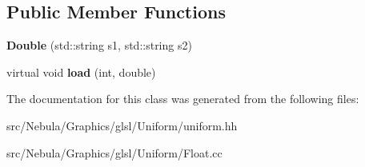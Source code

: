 \subsection*{\-Public \-Member \-Functions}
\begin{DoxyCompactItemize}
\item 
\hypertarget{classNeb_1_1glsl_1_1Uniform_1_1Vector_1_1Double_a4f5b3ffeff4c2d183a7af7401c434731}{{\bfseries \-Double} (std\-::string s1, std\-::string s2)}\label{classNeb_1_1glsl_1_1Uniform_1_1Vector_1_1Double_a4f5b3ffeff4c2d183a7af7401c434731}

\item 
\hypertarget{classNeb_1_1glsl_1_1Uniform_1_1Vector_1_1Double_a7241e6a2f7b3041cbc2beca1f83d504a}{virtual void {\bfseries load} (int, double)}\label{classNeb_1_1glsl_1_1Uniform_1_1Vector_1_1Double_a7241e6a2f7b3041cbc2beca1f83d504a}

\end{DoxyCompactItemize}


\-The documentation for this class was generated from the following files\-:\begin{DoxyCompactItemize}
\item 
src/\-Nebula/\-Graphics/glsl/\-Uniform/uniform.\-hh\item 
src/\-Nebula/\-Graphics/glsl/\-Uniform/\-Float.\-cc\end{DoxyCompactItemize}

